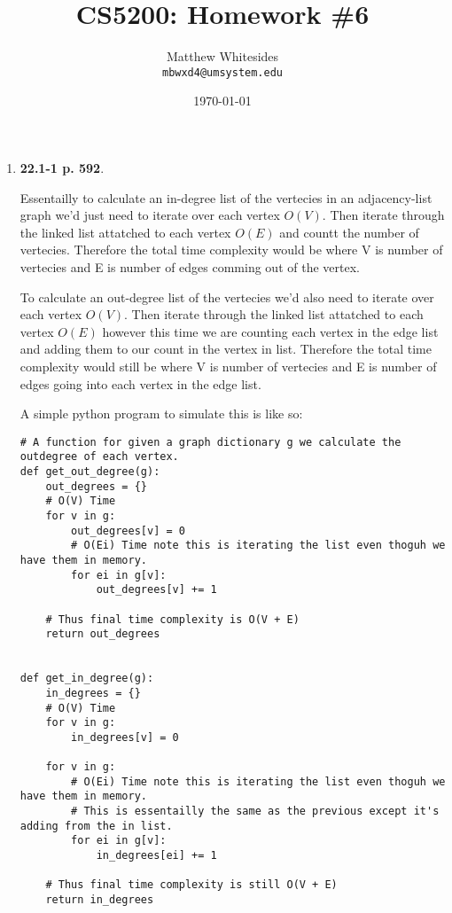 \documentclass{article}
\title{CS5200: Homework \#6} %
\author{Matthew Whitesides\\ \texttt{mbwxd4@umsystem.edu}} %
\date{\today} %
\begin{document}
  \maketitle %
 
  \begin{enumerate}
    \item \textbf{22.1-1 p. 592}.
    
    Essentailly to calculate an in-degree list of the vertecies in an adjacency-list graph we'd just need to iterate over each vertex $O(V)$.
    Then iterate through the linked list attatched to each vertex $O(E)$ and countt the number of vertecies.
    Therefore the total time complexity would be  where V is number of vertecies and E is number of edges comming out of the vertex.

    To calculate an out-degree list of the vertecies we'd also need to iterate over each vertex $O(V)$.
    Then iterate through the linked list attatched to each vertex $O(E)$ however this time we are counting each vertex in the edge list and adding them to our count in the vertex in list.
    Therefore the total time complexity would still be  where V is number of vertecies and E is number of edges going into each vertex in the edge list.

    A simple python program to simulate this is like so:

    \begin{lstlisting}
# A function for given a graph dictionary g we calculate the outdegree of each vertex.
def get_out_degree(g):
    out_degrees = {}
    # O(V) Time
    for v in g:
        out_degrees[v] = 0
        # O(Ei) Time note this is iterating the list even thoguh we have them in memory.
        for ei in g[v]:
            out_degrees[v] += 1 

    # Thus final time complexity is O(V + E)
    return out_degrees


def get_in_degree(g):
    in_degrees = {}
    # O(V) Time
    for v in g:
        in_degrees[v] = 0
        
    for v in g:
        # O(Ei) Time note this is iterating the list even thoguh we have them in memory.
        # This is essentailly the same as the previous except it's adding from the in list.
        for ei in g[v]:
            in_degrees[ei] += 1 

    # Thus final time complexity is still O(V + E)
    return in_degrees              
    \end{lstlisting}


\end{enumerate}
\end{document}
